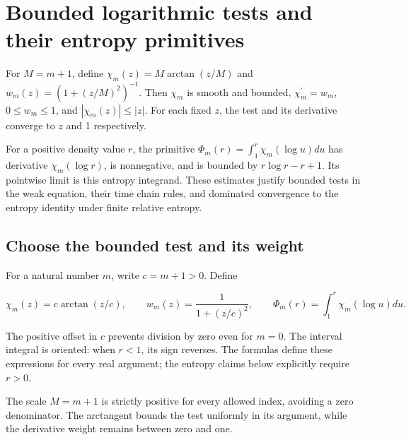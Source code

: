 \documentclass[11pt,a4paper]{report}
\begin{document}
\section{\texorpdfstring{Bounded logarithmic tests and their entropy primitives}{Bounded logarithmic tests and their entropy primitives}}
\label{proof-module-UnadjustedLangevin-LSI-BoundedLog-lean}


For \(M=m+1\), define \(\chi_m(z)=M\arctan(z/M)\) and \(w_m(z)=(1+(z/M)^2)^{-1}\). Then \(\chi_m\) is smooth and bounded, \(\chi_m^{\prime}=w_m\), \(0\le w_m\le1\), and \(|\chi_m(z)|\le|z|\). For each fixed \(z\), the test and its derivative converge to \(z\) and 1 respectively.



For a positive density value \(r\), the primitive \(\Phi_m(r)=\int_1^r\chi_m(\log u)du\) has derivative \(\chi_m(\log r)\), is nonnegative, and is bounded by \(r\log r-r+1\). Its pointwise limit is this entropy integrand. These estimates justify bounded tests in the weak equation, their time chain rules, and dominated convergence to the entropy identity under finite relative entropy.

\subsection{\texorpdfstring{Choose the bounded test and its weight}{Choose the bounded test and its weight}}
\label{report-step-UnadjustedLangevin-LSI-BoundedLog-lean-1}


For a natural number \(m\), write \(c=m+1>0\). Define

\[\chi_m(z)=c\arctan(z/c),\qquad w_m(z)=\frac1{1+(z/c)^2},\qquad\Phi_m(r)=\int_1^r\chi_m(\log u)du.\]

The positive offset in \(c\) prevents division by zero even for \(m=0\). The interval integral is oriented: when \(r<1\), its sign reverses. The formulas define these expressions for every real argument; the entropy claims below explicitly require \(r>0\).



The scale \(M=m+1\) is strictly positive for every allowed index, avoiding a zero denominator. The arctangent bounds the test uniformly in its argument, while the derivative weight remains between zero and one.
\end{document}
